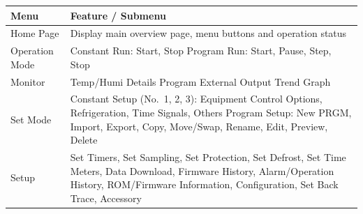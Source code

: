 \begin{longtable}[]{@{}ll@{}}
\toprule
\begin{minipage}[b]{0.13\columnwidth}\raggedright
Menu\strut
\end{minipage} & \begin{minipage}[b]{0.81\columnwidth}\raggedright
Feature / Submenu\strut
\end{minipage}\tabularnewline
\midrule
\endhead
\begin{minipage}[t]{0.13\columnwidth}\raggedright
Home Page\strut
\end{minipage} & \begin{minipage}[t]{0.81\columnwidth}\raggedright
Display main overview page, menu buttons and operation status\strut
\end{minipage}\tabularnewline
\begin{minipage}[t]{0.13\columnwidth}\raggedright
Operation Mode\strut
\end{minipage} & \begin{minipage}[t]{0.81\columnwidth}\raggedright
Constant Run: Start, Stop Program Run: Start, Pause, Step, Stop\strut
\end{minipage}\tabularnewline
\begin{minipage}[t]{0.13\columnwidth}\raggedright
Monitor\strut
\end{minipage} & \begin{minipage}[t]{0.81\columnwidth}\raggedright
Temp/Humi Details Program External Output Trend Graph\strut
\end{minipage}\tabularnewline
\begin{minipage}[t]{0.13\columnwidth}\raggedright
Set Mode\strut
\end{minipage} & \begin{minipage}[t]{0.81\columnwidth}\raggedright
Constant Setup (No.~1, 2, 3): Equipment Control Options, Refrigeration,
Time Signals, Others Program Setup: New PRGM, Import, Export, Copy,
Move/Swap, Rename, Edit, Preview, Delete\strut
\end{minipage}\tabularnewline
\begin{minipage}[t]{0.13\columnwidth}\raggedright
Setup\strut
\end{minipage} & \begin{minipage}[t]{0.81\columnwidth}\raggedright
Set Timers, Set Sampling, Set Protection, Set Defrost, Set Time Meters,
Data Download, Firmware History, Alarm/Operation History, ROM/Firmware
Information, Configuration, Set Back Trace, Accessory\strut
\end{minipage}\tabularnewline
\bottomrule
\end{longtable}

